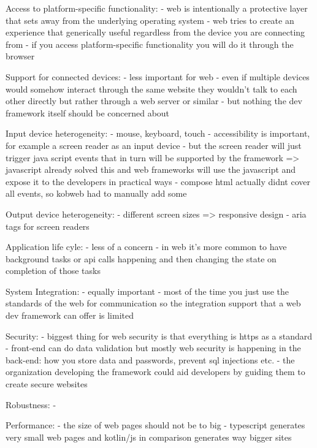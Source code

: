 Access to platform-specific functionality:
- web is intentionally a protective layer that sets away from the underlying operating system
- web tries to create an experience that generically useful regardless from the device you are connecting from
- if you access platform-specific functionality you will do it through the browser

Support for connected devices: 
- less important for web
- even if multiple devices would somehow interact through the same website they wouldn't talk to each other directly but rather through a web server or similar
- but nothing the dev framework itself should be concerned about

Input device heterogeneity: 
- mouse, keyboard, touch
- accessibility is important, for example a screen reader as an input device
- but the screen reader will just trigger java script events that in turn will be supported by the framework
=> javascript already solved this and web frameworks will use the javascript and expose it to the developers in practical ways
- compose html actually didnt cover all events, so kobweb had to manually add some

Output device heterogeneity: 
- different screen sizes => responsive design
- aria tags for screen readers

Application life cyle: 
- less of a concern
- in web it's more common to have background tasks or api calls happening and then changing the state on completion of those tasks

System Integration: 
- equally important
- most of the time you just use the standards of the web for communication so the integration support that a web dev framework can offer is limited

Security: 
- biggest thing for web security is that everything is https as a standard
- front-end can do data validation but mostly web security is happening in the back-end: how you store data and passwords, prevent sql injections etc. 
- the organization developing the framework could aid developers by guiding them to create secure websites

Robustness: 
- 





Performance:
- the size of web pages should not be to big
- typescript generates very small web pages and kotlin/js in comparison generates way bigger sites




